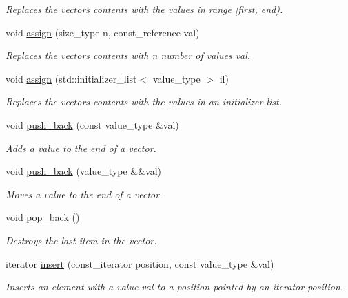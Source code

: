 \begin{DoxyCompactItemize}
\begin{DoxyCompactList}\small\item\em Replaces the vectors contents with the values in range \mbox{[}first, end). \end{DoxyCompactList}\item 
void \mbox{\hyperlink{classfake_1_1vector_a164e01bd25c0ee0bb10f6044d186c2fa}{assign}} (size\+\_\+type n, const\+\_\+reference val)
\begin{DoxyCompactList}\small\item\em Replaces the vectors contents with n number of values val. \end{DoxyCompactList}\item 
void \mbox{\hyperlink{classfake_1_1vector_a84afa1bde944ec3960a044387c34afde}{assign}} (std\+::initializer\+\_\+list$<$ value\+\_\+type $>$ il)
\begin{DoxyCompactList}\small\item\em Replaces the vectors contents with the values in an initializer list. \end{DoxyCompactList}\item 
void \mbox{\hyperlink{classfake_1_1vector_a91aad69b6cb2986a6b31f965633a9998}{push\+\_\+back}} (const value\+\_\+type \&val)
\begin{DoxyCompactList}\small\item\em Adds a value to the end of a vector. \end{DoxyCompactList}\item 
void \mbox{\hyperlink{classfake_1_1vector_a2532ed889fcf192d2f66080134d4470a}{push\+\_\+back}} (value\+\_\+type \&\&val)
\begin{DoxyCompactList}\small\item\em Moves a value to the end of a vector. \end{DoxyCompactList}\item 
\mbox{\label{classfake_1_1vector_a563f7b6d19a362439c3ef0b7baa2dcb8}} 
void \mbox{\hyperlink{classfake_1_1vector_a563f7b6d19a362439c3ef0b7baa2dcb8}{pop\+\_\+back}} ()
\begin{DoxyCompactList}\small\item\em Destroys the last item in the vector. \end{DoxyCompactList}\item 
iterator \mbox{\hyperlink{classfake_1_1vector_a1d09e69dcdbdcee51e53315a3c2c059e}{insert}} (const\+\_\+iterator position, const value\+\_\+type \&val)
\begin{DoxyCompactList}\small\item\em Inserts an element with a value val to a position pointed by an iterator position. \end{DoxyCompactList}\item 

\end{DoxyCompactItemize}
